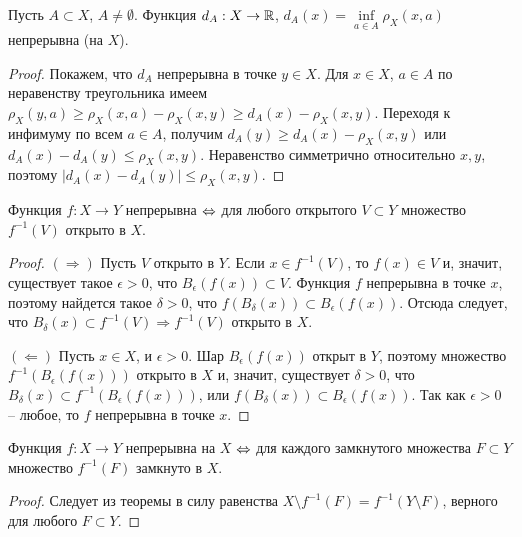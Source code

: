 
\begin{example}
    Пусть $A \subset X$, $A \neq \emptyset$. Функция $d_{A}: X \to \mathbb{R}$, $d_{A}(x) = \underset{a \in A}{\inf} \rho_{X}(x, a)$ непрерывна (на $X$).
\end{example}

\begin{proof}
    Покажем, что $d_{A}$ непрерывна в точке $y \in X$. Для $x \in X$, $a \in A$ по неравенству треугольника имеем $\rho_{X}(y, a) \geq \rho_{X}(x, a) - \rho_{X}(x, y) \geq d_{A}(x) - \rho_{X}(x, y)$. Переходя к инфимуму по всем $a \in A$, получим $d_{A}(y) \geq d_{A}(x) - \rho_{X}(x, y)$ или $d_{A}(x) - d_{A}(y) \leq \rho_{X}(x, y)$. Неравенство симметрично относительно $x, y$, поэтому $|d_{A}(x) - d_{A}(y)| \leq \rho_{X}(x, y)$.
\end{proof}

\begin{theorem}
    Функция $f: X \to Y$ непрерывна $\Leftrightarrow$ для любого открытого $V \subset Y$ множество $f^{-1}(V)$ открыто в $X$.
\end{theorem}

\begin{proof}
    $(\Rightarrow)$ Пусть $V$ открыто в $Y$. Если $x \in f^{-1}(V)$, то $f(x) \in V$ и, значит, существует такое $\epsilon > 0$, что $B_{\epsilon}(f(x)) \subset V$. Функция $f$ непрерывна в точке $x$, поэтому найдется такое $\delta > 0$, что $f(B_{\delta}(x)) \subset B_{\epsilon}(f(x))$. Отсюда следует, что $B_{\delta}(x) \subset f^{-1}(V) \Rightarrow f^{-1}(V)$ открыто в $X$.

    $(\Leftarrow)$ Пусть $x \in X$, и $\epsilon > 0$. Шар $B_{\epsilon}(f(x))$ открыт в $Y$, поэтому множество $f^{-1}(B_{\epsilon}(f(x)))$ открыто в $X$ и, значит, существует $\delta > 0$, что $B_{\delta}(x) \subset f^{-1}(B_{\epsilon}(f(x)))$, или $f(B_{\delta}(x)) \subset B_{\epsilon}(f(x))$. Так как $\epsilon > 0$ -- любое, то $f$ непрерывна в точке $x$.
\end{proof}

\begin{corollary}
    Функция $f: X \to Y$ непрерывна на $X$ $\Leftrightarrow$ для каждого замкнутого множества $F \subset Y$ множество $f^{-1}(F)$ замкнуто в $X$.
\end{corollary}

\begin{proof}
    Следует из теоремы в силу равенства $X \setminus f^{-1}(F) = f^{-1}(Y \setminus F)$, верного для любого $F \subset Y$.
\end{proof}

